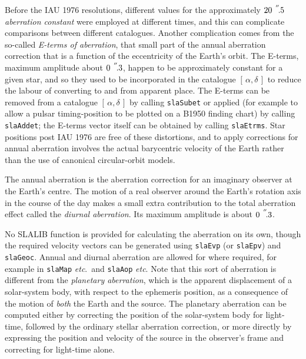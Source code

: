 \documentclass[11pt,fleqn,twoside]{article}
\renewcommand{\_}{{\tt\char'137}}     %
\newcommand{\radec}     {$[\,\alpha,\delta\,]$}
\newcommand{\arcseci}[1] {$#1\hspace{0.05em}$\raisebox{-0.5ex}
                         {$^{'\hspace{-0.1em}'\hspace{0.0em}}$}}
\newcommand{\arcsec}[2] {\arcseci{#1}$\hspace{-0.35em}.#2$}
\begin{document}
Before the IAU 1976 resolutions, different
values for the approximately
\arcsec{20}{5} {\it aberration constant}\/ were employed
at different times, and this can complicate comparisons
between different catalogues.  Another complication comes from
the so-called {\it E-terms of aberration},
that small part of the annual aberration correction that is a
function of the eccentricity of the Earth's orbit.  The E-terms,
maximum amplitude about \arcsec{0}{3},
happen to be approximately constant for a given star, and so they
used to be incorporated in the catalogue \radec\/
to reduce the labour of converting to and from apparent place.
The E-terms can be removed from a catalogue \radec\/ by
calling
{\tt slaSubet}
or applied (for example to allow a pulsar
timing-position to be plotted on a B1950 finding chart)
by calling
{\tt slaAddet};
the E-terms vector itself can be obtained by calling
{\tt slaEtrms}.
Star positions post IAU 1976 are free of these distortions, and to
apply corrections for annual aberration involves the actual
barycentric velocity of the Earth rather than the use of
canonical circular-orbit models.
 
The annual aberration is the aberration correction for
an imaginary observer at the Earth's centre.
The motion of a real observer around the Earth's rotation axis in
the course of the day makes a small extra contribution to the total
aberration effect called the {\it diurnal aberration}.  Its
maximum amplitude is about \arcsec{0}{3}.

No SLALIB function is provided for calculating the aberration on
its own, though the required velocity vectors can be
generated using
{\tt slaEvp} (or
{\tt slaEpv})
and
{\tt slaGeoc}.
Annual and diurnal aberration are allowed for where required, for example in
{\tt slaMap}
{\it etc}.\ and
{\tt slaAop}
{\it etc}.  Note that this sort
of aberration is different from the {\it planetary
aberration}, which is the apparent displacement of a solar-system
body, with respect to the ephemeris position, as a consequence
of the motion of {\it both}\/ the Earth and the source.  The
planetary aberration can be computed either by correcting the
position of the solar-system body for light-time, followed by
the ordinary stellar aberration correction, or more
directly by expressing the position and velocity of the source
in the observer's frame and correcting for light-time alone.
\end{document}
